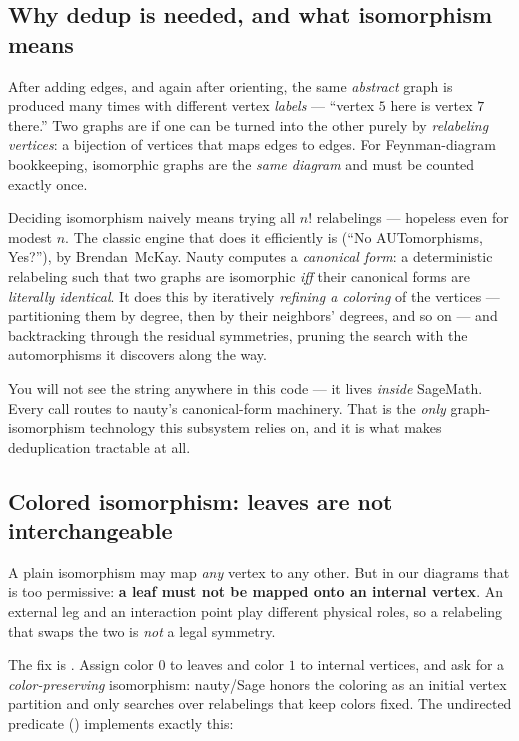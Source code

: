 \subsection{Why dedup is needed, and what isomorphism means}

After adding edges, and again after orienting, the same \emph{abstract} graph is
produced many times with different vertex \emph{labels} --- ``vertex $5$ here is
vertex $7$ there.'' Two graphs are  if one can be turned into
the other purely by \emph{relabeling vertices}: a bijection of vertices that maps
edges to edges. For Feynman-diagram bookkeeping, isomorphic graphs are the
\emph{same diagram} and must be counted exactly once.

Deciding isomorphism naively means trying all $n!$ relabelings --- hopeless even
for modest $n$. The classic engine that does it efficiently is 
(``No AUTomorphisms, Yes?''), by Brendan~McKay. Nauty computes a \emph{canonical
form}: a deterministic relabeling such that two graphs are isomorphic \emph{iff}
their canonical forms are \emph{literally identical}. It does this by iteratively
\emph{refining a coloring} of the vertices --- partitioning them by degree, then
by their neighbors' degrees, and so on --- and backtracking through the residual
symmetries, pruning the search with the automorphisms it discovers along the way.

\begin{note}
You will not see the string  anywhere in this code --- it lives
\emph{inside} SageMath. Every  call routes to nauty's
canonical-form machinery. That is the \emph{only} graph-isomorphism technology
this subsystem relies on, and it is what makes deduplication tractable at all.
\end{note}

\subsection{Colored isomorphism: leaves are not interchangeable}

A plain isomorphism may map \emph{any} vertex to any other. But in our diagrams
that is too permissive: \textbf{a leaf must not be mapped onto an internal
vertex}. An external leg and an interaction point play different physical roles,
so a relabeling that swaps the two is \emph{not} a legal symmetry.

The fix is . Assign color $0$ to leaves and color $1$ to
internal vertices, and ask for a \emph{color-preserving} isomorphism: nauty/Sage
honors the coloring as an initial vertex partition and only searches over
relabelings that keep colors fixed. The undirected predicate
 ()
implements exactly this:


